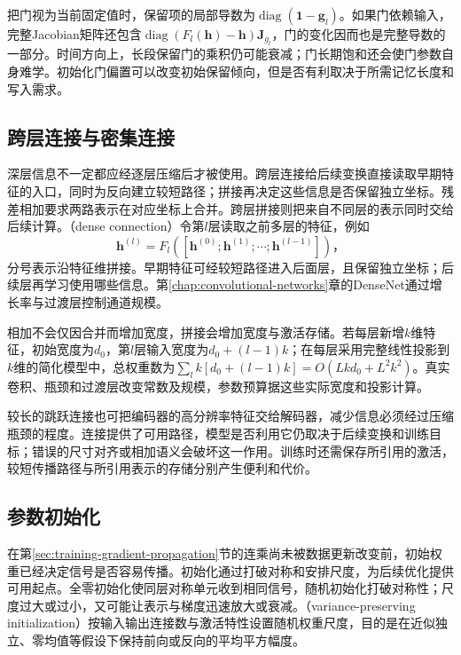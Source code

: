 把门视为当前固定值时，保留项的局部导数为$\operatorname{diag}(\bm1-\bm g_l)$。如果门依赖输入，完整Jacobian矩阵还包含$\operatorname{diag}(F_l(\bm h)-\bm h)\bm J_{g_l}$，门的变化因而也是完整导数的一部分。时间方向上，长段保留门的乘积仍可能衰减；门长期饱和还会使门参数自身难学。初始化门偏置可以改变初始保留倾向，但是否有利取决于所需记忆长度和写入需求。

\subsection{跨层连接与密集连接}
\label{sec:training-dense-connections}

深层信息不一定都应经逐层压缩后才被使用。跨层连接给后续变换直接读取早期特征的入口，同时为反向建立较短路径；拼接再决定这些信息是否保留独立坐标。残差相加要求两路表示在对应坐标上合并。跨层拼接则把来自不同层的表示同时交给后续计算。（dense connection）令第$l$层读取之前多层的特征，例如
\begin{equation}
  \bm h^{(l)}=F_l([\bm h^{(0)};\bm h^{(1)};\cdots;\bm h^{(l-1)}])\text{，}
  \label{eq:training-dense-concat}
\end{equation}
分号表示沿特征维拼接。早期特征可经较短路径进入后面层，且保留独立坐标；后续层再学习使用哪些信息。第\ref{chap:convolutional-networks}章的DenseNet通过增长率与过渡层控制通道规模。

相加不会仅因合并而增加宽度，拼接会增加宽度与激活存储。若每层新增$k$维特征，初始宽度为$d_0$，第$l$层输入宽度为$d_0+(l-1)k$；在每层采用完整线性投影到$k$维的简化模型中，总权重数为$\sum_l k[d_0+(l-1)k]=O(Lkd_0+L^2k^2)$。真实卷积、瓶颈和过渡层改变常数及规模，参数预算据这些实际宽度和投影计算。

较长的跳跃连接也可把编码器的高分辨率特征交给解码器，减少信息必须经过压缩瓶颈的程度。连接提供了可用路径，模型是否利用它仍取决于后续变换和训练目标；错误的尺寸对齐或相加语义会破坏这一作用。训练时还需保存所引用的激活，较短传播路径与所引用表示的存储分别产生便利和代价。

\subsection{参数初始化}
\label{sec:training-initialization-constraints}
\label{sec:training-initialization}

在第\ref{sec:training-gradient-propagation}节的连乘尚未被数据更新改变前，初始权重已经决定信号是否容易传播。初始化通过打破对称和安排尺度，为后续优化提供可用起点。全零初始化使同层对称单元收到相同信号，随机初始化打破对称性；尺度过大或过小，又可能让表示与梯度迅速放大或衰减。（variance-preserving initialization）按输入输出连接数与激活特性设置随机权重尺度，目的是在近似独立、零均值等假设下保持前向或反向的平均平方幅度。

